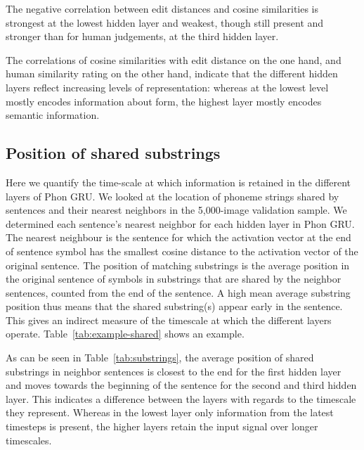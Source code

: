 The negative correlation between edit distances and cosine similarities is strongest at the lowest hidden layer and weakest, though still present and stronger than for human judgements, at the third hidden layer. 

The correlations of cosine similarities with edit distance on the one hand, and human similarity rating on the other hand, indicate that the different hidden layers reflect increasing levels of representation: whereas at the lowest level mostly encodes information about form, the highest layer mostly encodes semantic information.


\subsection{Position of shared substrings}
Here we quantify the time-scale at which information is retained in
the different layers of {\sc Phon GRU}. We looked at the location of
phoneme strings shared by sentences and their nearest neighbors in the 5,000-image validation sample.
We determined each sentence's nearest neighbor for each hidden layer in {\sc Phon GRU}. The nearest neighbour is the sentence for which the activation vector at the end of sentence symbol has the smallest cosine distance to the activation vector of the original sentence. The position of matching substrings is the average position in the original sentence of symbols in substrings that are shared by the neighbor sentences, counted from the end of the sentence. A high mean average substring position thus means that the shared substring(s) appear early in the sentence. This gives an indirect measure of the timescale at which the different layers operate. Table~\ref{tab:example-shared} shows an example.

As can be seen in Table~\ref{tab:substrings}, the average position of shared substrings in neighbor sentences is closest to the end for the first hidden layer and moves towards the beginning of the sentence for the second and third hidden layer. This indicates a difference between the layers with regards to the timescale they represent. Whereas in the lowest layer only information from the latest timesteps is present, the higher layers retain the input signal over longer timescales.

